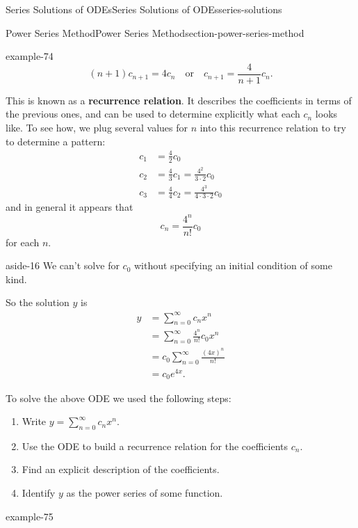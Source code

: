 \documentclass[oneside,10pt,]{book}
\newcommand{\terminology}[1]{\textbf{#1}}
\numberwithin{equation}{section}
\newcommand{\qq}[1]{\quad\text{#1}\quad}
\newcommand{\amp}{&}
\begin{document}
\begin{chapterptx}{Series Solutions of ODEs}{}{Series Solutions of ODEs}{}{}{series-solutions}
\begin{sectionptx}{Power Series Method}{}{Power Series Method}{}{}{section-power-series-method}
\begin{example}{}{example-74}
\begin{equation*}
(n+1)c_{n+1} = 4c_{n}\qq{or} c_{n+1} = \frac{4}{n+1}c_{n}.
\end{equation*}
%
\par
\hypertarget{p-445}{}%
This is known as a \terminology{recurrence relation}. It describes the coefficients in terms of the previous ones, and can be used to determine explicitly what each \(c_{n}\) looks like. To see how, we plug several values for \(n\) into this recurrence relation to try to determine a pattern:%
\begin{align*}
c_{1} \amp= \frac{4}{2}c_{0}\\
c_{2} \amp= \frac{4}{3}c_{1} = \frac{4^{2}}{3\cdot2}c_{0}\\
c_{3} \amp= \frac{4}{4}c_{2} = \frac{4^{3}}{4\cdot3\cdot2}c_{0}
\end{align*}
and in general it appears that%
\begin{equation*}
c_{n} = \frac{4^{n}}{n!}c_{0}
\end{equation*}
for each \(n\). \begin{aside}{}{aside-16}%
\hypertarget{p-446}{}%
We can't solve for \(c_{0}\) without specifying an initial condition of some kind.%
\end{aside}
 So the solution \(y\) is%
\begin{align*}
y \amp= \sum_{n=0}^{\infty}c_{n}x^{n}\\
\amp= \sum_{n=0}^{\infty}\frac{4^{n}}{n!}c_{0}x^{n}\\
\amp= c_{0}\sum_{n=0}^{\infty}\frac{(4x)^{n}}{n!}\\
\amp= c_{0}e^{4x}\text{.}
\end{align*}
%
\end{example}
\hypertarget{p-447}{}%
To solve the above ODE we used the following steps:\leavevmode%
\begin{enumerate}
\item\hypertarget{li-25}{}\hypertarget{p-448}{}%
Write \(y = \sum_{n=0}^{\infty}c_{n}x^{n}\).%
\item\hypertarget{li-26}{}\hypertarget{p-449}{}%
Use the ODE to build a recurrence relation for the coefficients \(c_{n}\).%
\item\hypertarget{li-27}{}\hypertarget{p-450}{}%
Find an explicit description of the coefficients.%
\item\hypertarget{li-28}{}\hypertarget{p-451}{}%
Identify \(y\) as the power series of some function.%
\end{enumerate}
%
\begin{example}{}{example-75}%
\hypertarget{p-452}{}%

\end{example}
\end{sectionptx}
\end{chapterptx}
\end{document}
